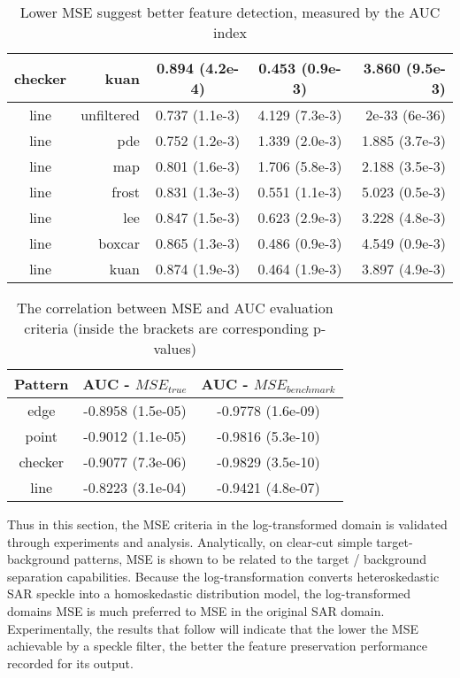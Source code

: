 \begin{table}[h!]
\begin{tabular}{c|r|c|c|r}
 checker  &  kuan  &  0.894 (4.2e-4)  &  0.453 (0.9e-3)  &  3.860 (9.5e-3)\\
\hline
 line  &  unfiltered  &  0.737 (1.1e-3)  &  4.129 (7.3e-3)  &  2e-33 (6e-36)\\
 line  &  pde  &  0.752 (1.2e-3)  &  1.339 (2.0e-3)  &  1.885 (3.7e-3)\\
 line  &  map  &  0.801 (1.6e-3)  &  1.706 (5.8e-3)  &  2.188 (3.5e-3)\\
 line  &  frost  &  0.831 (1.3e-3)  &  0.551 (1.1e-3)  &  5.023 (0.5e-3)\\
 line  &  lee  &  0.847 (1.5e-3)  &  0.623 (2.9e-3)  &  3.228 (4.8e-3)\\
 line  &  boxcar  &  0.865 (1.3e-3)  &  0.486 (0.9e-3)  &  4.549 (0.9e-3)\\
 line  &  kuan  &  0.874 (1.9e-3)  &  0.464 (1.9e-3)  &  3.897 (4.9e-3)\\
\hline
\end{tabular}

\caption{Lower MSE suggest better feature detection, measured by the AUC index}
\label{tab:mse_auc_in_log_domain}
\end{table}

\begin{table}
\centering
\begin{tabular}{c|c|c}
Pattern  & AUC - $MSE_{true}$  & AUC - $MSE_{benchmark}$  \\
\hline
edge & -0.8958 (1.5e-05) &   -0.9778  (1.6e-09) \\
point &     -0.9012   (1.1e-05)   &    -0.9816        (5.3e-10) \\
checker &   -0.9077     (7.3e-06)  &  -0.9829       (3.5e-10) \\
line &      -0.8223     (3.1e-04)  &   -0.9421       (4.8e-07) \\
\hline
\end{tabular}

\caption{The correlation between MSE and AUC evaluation criteria (inside the brackets are corresponding p-values)}
\label{tab:mse_auc_corr_coeff}
\end{table}

Thus in this section, the MSE criteria in the log-transformed domain is validated through experiments and analysis.
Analytically, on clear-cut simple target-background patterns, MSE is shown to be related to the target / background separation capabilities. 
Because the log-transformation converts heteroskedastic SAR speckle into a homoskedastic distribution model, 
	the log-transformed domains MSE is much preferred to MSE in the original SAR domain.
Experimentally, the results that follow will indicate that
	the lower the MSE achievable by a speckle filter,
	the better the feature preservation performance recorded for its output.
        
